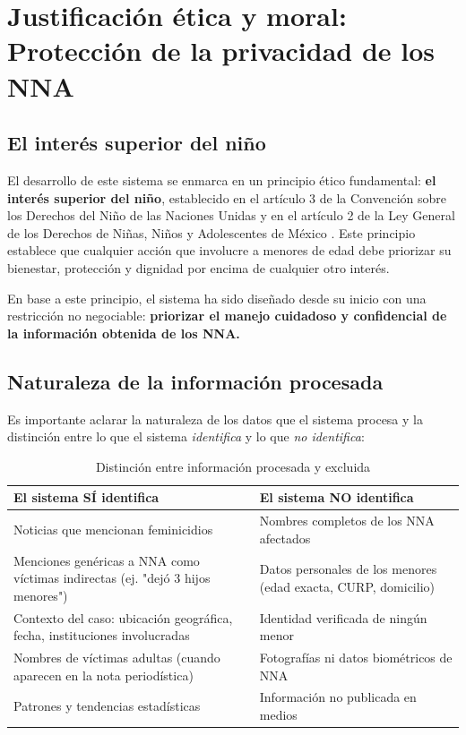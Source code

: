 \section{Justificación ética y moral: Protección de la privacidad de los NNA} 
\label{sec:justificacionEtica} 

\subsection{El interés superior del niño}

El desarrollo de este sistema se enmarca en un principio ético fundamental: \textbf{el interés superior del niño},
establecido en el artículo 3 de la Convención sobre los Derechos del Niño de las Naciones Unidas \cite{onu1989}
y en el artículo 2 de la Ley General de los Derechos de Niñas, Niños y Adolescentes de México \cite{lgdnna2014}.
Este principio establece que cualquier acción que involucre a menores de edad debe priorizar su bienestar, protección
y dignidad por encima de cualquier otro interés.

En base a este principio, el sistema ha sido diseñado desde su inicio con una restricción no negociable:
\textbf{priorizar el manejo cuidadoso y confidencial de la información obtenida de los NNA.}

\subsection{Naturaleza de la información procesada}

Es importante aclarar la naturaleza de los datos que el sistema procesa y la distinción entre lo que el sistema
\textit{identifica} y lo que \textit{no identifica}:

\vspace{0.5cm}
\begin{table}[htbp]
\centering
\caption{Distinción entre información procesada y excluida}
\label{tab:distincionDatos}
\begin{tabular}{|p{6cm}|p{6cm}|}
\hline
\textbf{El sistema SÍ identifica} & \textbf{El sistema NO identifica} \\ \hline
Noticias que mencionan feminicidios & Nombres completos de los NNA afectados \\ \hline
Menciones genéricas a NNA como víctimas indirectas (ej. "dejó 3 hijos menores") & Datos personales de los menores (edad exacta, CURP, domicilio) \\ \hline
Contexto del caso: ubicación geográfica, fecha, instituciones involucradas & Identidad verificada de ningún menor \\ \hline
Nombres de víctimas adultas (cuando aparecen en la nota periodística) & Fotografías ni datos biométricos de NNA \\ \hline
Patrones y tendencias estadísticas & Información no publicada en medios \\ \hline
\end{tabular}
\end{table}
\vspace{0.4cm}

